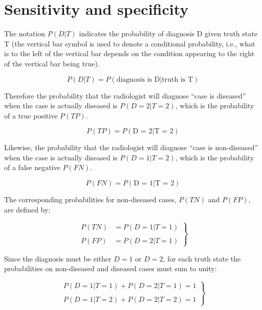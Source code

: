 \documentclass[
]{book}
\begin{document}
\hypertarget{sensitivity-and-specificity}{%
\section{Sensitivity and specificity}\label{sensitivity-and-specificity}}

The notation \(P(D|T)\) indicates the probability of diagnosis D given truth state T (the vertical bar symbol is used to denote a conditional probability, i.e., what is to the left of the vertical bar depends on the condition appearing to the right of the vertical bar being true).

\begin{equation} 
P(D|T) = P(\text{diagnosis is D} | \text{truth is T})
\label{eq:binary-taskPDGivenT}
\end{equation}

Therefore the probability that the radiologist will diagnose ``case is diseased'' when the case is actually diseased is \(P(D=2|T=2)\), which is the probability of a true positive \(P(TP)\).

\begin{equation} 
P(TP) = P(\text{D = 2} | \text{T = 2})
\label{eq:binary-taskPTP}
\end{equation}

Likewise, the probability that the radiologist will diagnose ``case is non-diseased'' when the case is actually diseased is \(P(D=1|T=2)\), which is the probability of a false negative \(P(FN)\).

\begin{equation} 
P(FN) = P(\text{D = 1} | \text{T = 2})
\label{eq:binary-taskPFN}
\end{equation}

The corresponding probabilities for non-diseased cases, \(P(TN)\) and \(P(FP)\), are defined by:

\begin{equation} 
\left.\begin{aligned}
P(TN)&=P(D=1|T=1)\\ 
\\
P(FP)&=P(D=2|T=1)
\end{aligned}\right\}
\label{eq:binary-taskPTNFP}
\end{equation}

Since the diagnosis must be either \(D=1\) or \(D=2\), for each truth state the probabilities on non-diseased and diseased cases must sum to unity:

\begin{equation} 
\left.\begin{matrix}
P(D=1|T=1)+P(D=2|T=1)=1\\ 
\\  
P(D=1|T=2)+P(D=2|T=2)=1
\end{matrix}\right\}
\label{eq:binary-taskPSumsToUnity}
\end{equation}
\end{document}
